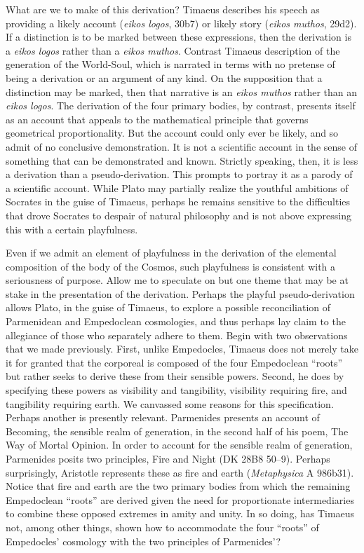 What are we to make of this derivation? Timaeus describes his speech as providing a likely account (\emph{eikos logos}, 30b7) or likely story (\emph{eikos muthos}, 29d2). If a distinction is to be marked between these expressions, then the derivation is a \emph{eikos logos} rather than a \emph{eikos muthos}. Contrast Timaeus description of the generation of the World-Soul, which is narrated in terms with no pretense of being a derivation or an argument of any kind. On the supposition that a distinction may be marked, then that narrative is an \emph{eikos muthos} rather than an \emph{eikos logos}. The derivation of the four primary bodies, by contrast, presents itself as an account that appeals to the mathematical principle that governs geometrical proportionality. But the account could only ever be likely, and so admit of no conclusive demonstration. It is not a scientific account in the sense of something that can be demonstrated and known. Strictly speaking, then, it is less a derivation than a pseudo-derivation. This prompts \citet{Prtichard:1990aa} to portray it as a parody of a scientific account. While Plato may partially realize the youthful ambitions of Socrates in the guise of Timaeus, perhaps he remains sensitive to the difficulties that drove Socrates to despair of natural philosophy and is not above expressing this with a certain playfulness.

Even if we admit an element of playfulness in the derivation of the elemental composition of the body of the Cosmos, such playfulness is consistent with a seriousness of purpose. Allow me to speculate on but one theme that may be at stake in the presentation of the derivation. Perhaps the playful pseudo-derivation allows Plato, in the guise of Timaeus, to explore a possible reconciliation of Parmenidean and Empedoclean cosmologies, and thus perhaps lay claim to the allegiance of those who separately adhere to them. Begin with two observations that we made previously. First, unlike Empedocles, Timaeus does not merely take it for granted that the corporeal is composed of the four Empedoclean ``roots'' but rather seeks to derive these from their sensible powers. Second, he does by specifying these powers as visibility and tangibility, visibility requiring fire, and tangibility requiring earth. We canvassed some reasons for this specification. Perhaps another is presently relevant. Parmenides presents an account of Becoming, the sensible realm of generation, in the second half of his poem, The Way of Mortal Opinion. In order to account for the sensible realm of generation, Parmenides posits two principles, Fire and Night (DK 28B8 50--9). Perhaps surprisingly, Aristotle represents these as fire and earth (\emph{Metaphysica} A 986b31). Notice that fire and earth are the two primary bodies from which the remaining Empedoclean ``roots'' are derived given the need for proportionate intermediaries to combine these opposed extremes in amity and unity. In so doing, has Timaeus not, among other things, shown how to accommodate the four ``roots'' of Empedocles' cosmology with the two principles of Parmenides'? 

